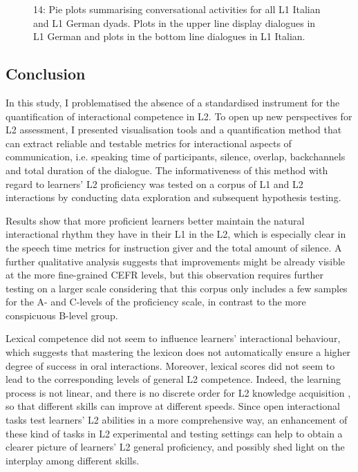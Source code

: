 \begin{stylecaption}
  
 
\end{stylecaption}

\begin{stylecaption}\begin{figure}
\caption{14: Pie plots summarising conversational activities for all L1 Italian and L1 German dyads. Plots in the upper line display dialogues in L1 German and plots in the bottom line dialogues in L1 Italian.}
\label{fig:key:3}
\end{figure}\end{stylecaption}

\subsection{Conclusion}
\hypertarget{Toc191305940}{}
In this study, I problematised the absence of a standardised instrument for the quantification of interactional competence in L2. To open up new perspectives for L2 assessment, I presented visualisation tools and a quantification method that can extract reliable and testable metrics for interactional aspects of communication, i.e. speaking time of participants, silence, overlap, backchannels and total duration of the dialogue. The informativeness of this method with regard to learners’ L2 proficiency was tested on a corpus of L1 and L2 interactions by conducting data exploration and subsequent hypothesis testing.

Results show that more proficient learners better maintain the natural interactional rhythm they have in their L1 in the L2, which is especially clear in the speech time metrics for instruction giver and the total amount of silence. A further qualitative analysis suggests that improvements might be already visible at the more fine-grained CEFR levels, but this observation requires further testing on a larger scale considering that this corpus only includes a few samples for the A- and C-levels of the proficiency scale, in contrast to the more conspicuous B-level group.

Lexical competence did not seem to influence learners’ interactional behaviour, which suggests that mastering the lexicon does not automatically ensure a higher degree of success in oral interactions. Moreover, lexical scores did not seem to lead to the corresponding levels of general L2 competence. Indeed, the learning process is not linear, and there is no discrete order for L2 knowledge acquisition \citep{Nava2010}, so that different skills can improve at different speeds. Since open interactional tasks test learners’ L2 abilities in a more comprehensive way, an enhancement of these kind of tasks in L2 experimental and testing settings can help to obtain a clearer picture of learners’ L2 general proficiency, and possibly shed light on the interplay among different skills.

